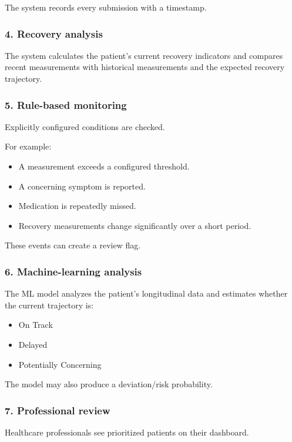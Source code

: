 \documentclass[11pt,a4paper]{article}
\begin{document}
The system records every submission with a timestamp.

\subsubsection{4. Recovery analysis}

The system calculates the patient's current recovery
indicators and compares recent measurements with historical measurements and
the expected recovery trajectory.

\subsubsection{5. Rule-based monitoring}

Explicitly configured conditions are checked.

For example:
\begin{itemize}[leftmargin=0.7cm]
    \item A measurement exceeds a configured threshold.
    \item A concerning symptom is reported.
    \item Medication is repeatedly missed.
    \item Recovery measurements change significantly over a short period.
\end{itemize}

These events can create a review flag.

\subsubsection{6. Machine-learning analysis}

The ML model analyzes the patient's longitudinal data and
estimates whether the current trajectory is:
\begin{itemize}[leftmargin=0.7cm]
    \item On Track
    \item Delayed
    \item Potentially Concerning
\end{itemize}

The model may also produce a deviation/risk probability.

\subsubsection{7. Professional review}

Healthcare professionals see prioritized patients on their
dashboard.
\end{document}
